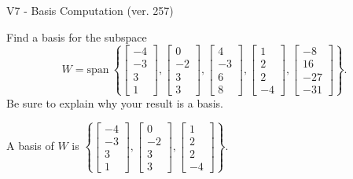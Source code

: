 \begin{exercise}
  \begin{exerciseTitle}V7 - Basis Computation (ver. 257)\end{exerciseTitle}
  \begin{exerciseStatement}
    Find a basis for the subspace 
\[W=\mathrm{span}\ \left\{\left[\begin{array}{r}
-4 \\
-3 \\
3 \\
1
\end{array}\right] , \left[\begin{array}{r}
0 \\
-2 \\
3 \\
3
\end{array}\right] , \left[\begin{array}{r}
4 \\
-3 \\
6 \\
8
\end{array}\right] , \left[\begin{array}{r}
1 \\
2 \\
2 \\
-4
\end{array}\right] , \left[\begin{array}{r}
-8 \\
16 \\
-27 \\
-31
\end{array}\right]\right\}.\]
 Be sure to explain why your result is a basis.


  \end{exerciseStatement}
  \begin{exerciseAnswer}
   A basis of \(W\) is  \(\left\{\left[\begin{array}{r}
-4 \\
-3 \\
3 \\
1
\end{array}\right] , \left[\begin{array}{r}
0 \\
-2 \\
3 \\
3
\end{array}\right] , \left[\begin{array}{r}
1 \\
2 \\
2 \\
-4
\end{array}\right]\right\}\).
  


  \end{exerciseAnswer}
\end{exercise}